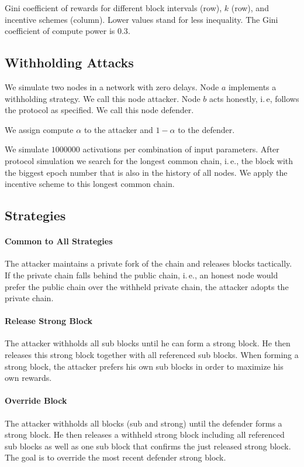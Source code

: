 \documentclass{article}
\begin{document}
\begin{table}
  \caption{Gini coefficient of rewards for different block intervals (row), $k$ (row), and incentive schemes (column).
  Lower values stand for less inequality. The Gini coefficient of compute power is $0.3$.}
  \label{tab:reward_gini}
  
\end{table}

\subsection{Withholding Attacks}

We simulate two nodes in a network with zero delays.
Node $a$ implements a withholding strategy.
We call this node attacker.
Node $b$ acts honestly, i.\,e, follows the protocol as specified.
We call this node defender.

We assign compute $\alpha$ to the attacker and $1-\alpha$ to the defender.

We simulate $1 000 000$ activations per combination of input parameters.
After protocol simulation we search for the longest common chain, i.\,e., the block with the biggest epoch number that is also in the history of all nodes.
We apply the incentive scheme to this longest common chain.

\subsection{Strategies}

\paragraph{Common to All Strategies}
The attacker maintains a private fork of the chain and releases blocks tactically.
If the private chain falls behind the public chain, i.\,e., an honest node would prefer the public chain over the withheld private chain, the attacker adopts the private chain.

\paragraph{Release Strong Block}
The attacker withholds all sub blocks until he can form a strong block.
He then releases this strong block together with all referenced sub blocks.
When forming a strong block, the attacker prefers his own sub blocks in order to maximize his own rewards.

\paragraph{Override Block}
The attacker withholds all blocks (sub and strong) until the defender forms a strong block.
He then releases a withheld strong block including all referenced sub blocks as well as one sub block that confirms the just released strong block.
The goal is to override the most recent defender strong block.
\end{document}
